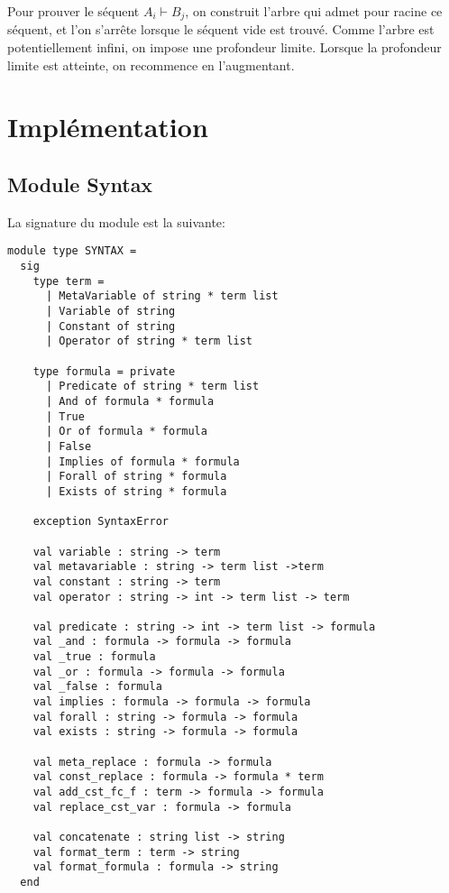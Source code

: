 \documentclass[12pt]{article}
\begin{document}
Pour prouver le séquent $A_i \vdash B_j$, on construit l'arbre qui admet pour racine ce séquent, et l'on s'arrête lorsque le séquent vide est trouvé. Comme l'arbre est potentiellement infini, on impose une profondeur limite. Lorsque la profondeur limite est atteinte, on recommence en l'augmentant.

\section{Implémentation}

\subsection{Module Syntax}
La signature du module est la suivante:
\begin{multicols}{2}
\begin{lstlisting}[basicstyle=\tiny]
module type SYNTAX =
  sig
    type term = 
      | MetaVariable of string * term list
      | Variable of string
      | Constant of string
      | Operator of string * term list
                  
    type formula = private 
      | Predicate of string * term list
      | And of formula * formula
      | True
      | Or of formula * formula
      | False
      | Implies of formula * formula
      | Forall of string * formula
      | Exists of string * formula

    exception SyntaxError
                
    val variable : string -> term
    val metavariable : string -> term list ->term
    val constant : string -> term
    val operator : string -> int -> term list -> term

    val predicate : string -> int -> term list -> formula
    val _and : formula -> formula -> formula
    val _true : formula
    val _or : formula -> formula -> formula
    val _false : formula
    val implies : formula -> formula -> formula
    val forall : string -> formula -> formula
    val exists : string -> formula -> formula

    val meta_replace : formula -> formula
    val const_replace : formula -> formula * term 
    val add_cst_fc_f : term -> formula -> formula
    val replace_cst_var : formula -> formula

    val concatenate : string list -> string
    val format_term : term -> string
    val format_formula : formula -> string
  end
\end{lstlisting}
\end{multicols}
\end{document}

